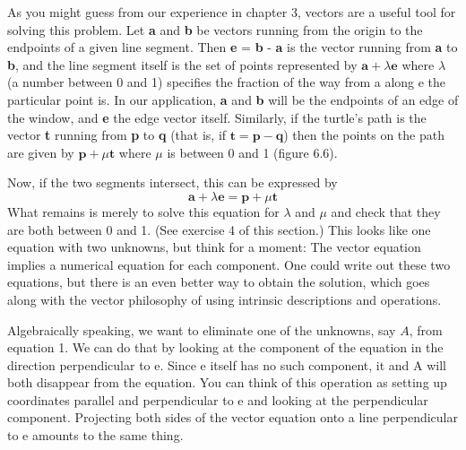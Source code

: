 \documentclass{book}
\begin{document}
As you might guess from our experience in chapter 3, vectors are a
useful tool for solving this problem. Let \textbf{a} and \textbf{b} be vectors running from
the origin to the endpoints of a given line segment. Then \textbf{e} = \textbf{b} - \textbf{a}
is the vector running from \textbf{a} to \textbf{b}, and the line segment itself is the
set of points represented by $\mathbf{a} + \lambda \mathbf{e}$ where $\lambda$ (a number between 0 and
1) specifies the fraction of the way from a along e the particular point
is. In our application, \textbf{a} and \textbf{b} will be the endpoints of an edge of the
window, and \textbf{e} the edge vector itself. Similarly, if the turtle's path is
the vector \textbf{t} running from \textbf{p} to \textbf{q} (that is, if $\mathbf{t} = \mathbf{p} - \mathbf{q}$) then the points
on the path are given by $\mathbf{p} + \mu \mathbf{t}$ where $\mu$ is between 0 and 1 (figure 6.6).

Now, if the two segments intersect, this can be expressed by
$$\mathbf{a} + \lambda \mathbf{e} = \mathbf{p} + \mu \mathbf{t}$$
 What remains is merely to solve this equation for $\lambda$ and $\mu$ and check that
they are both between 0 and 1. (See exercise 4 of this section.) This
looks like one equation with two unknowns, but think for a moment:
The vector equation implies a numerical equation for each component.
One could write out these two equations, but there is an even better way
to obtain the solution, which goes along with the vector philosophy of
using intrinsic descriptions and operations.

Algebraically speaking, we want to eliminate one of the unknowns,
say $A$, from equation 1. We can do that by looking at the component
of the equation in the direction perpendicular to e. Since e itself has no
such component, it and A will both disappear from the equation. You
can think of this operation as setting up coordinates parallel and perpendicular to e and looking at the perpendicular component. Projecting
both sides of the vector equation onto a line perpendicular to e amounts
to the same thing.
\end{document}
